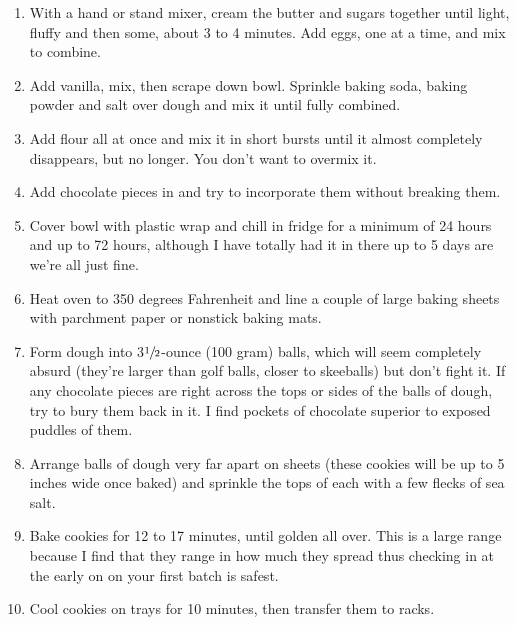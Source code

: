 \begin{enumerate}
    \item With a hand or stand mixer, cream the butter and sugars together until light, fluffy and then some, about 3 to 4 minutes. Add eggs, one at a time, and mix to combine.
    \item Add vanilla, mix, then scrape down bowl. Sprinkle baking soda, baking powder and salt over dough and mix it until fully combined. 
    \item Add flour all at once and mix it in short bursts until it almost completely disappears, but no longer. You don’t want to overmix it.
    \item Add chocolate pieces in and try to incorporate them without breaking them.
    \item Cover bowl with plastic wrap and chill in fridge for a minimum of 24 hours and up to 72 hours, although I have totally had it in there up to 5 days are we’re all just fine.
    \item Heat oven to 350 degrees Fahrenheit and line a couple of large baking sheets with parchment paper or nonstick baking mats.
    \item Form dough into 3$\sfrac{1}{2}$-ounce (100 gram) balls, which will seem completely absurd (they’re larger than golf balls, closer to skeeballs) but don’t fight it. If any chocolate pieces are right across the tops or sides of the balls of dough, try to bury them back in it. I find pockets of chocolate superior to exposed puddles of them. 
    \item Arrange balls of dough very far apart on sheets (these cookies will be up to 5 inches wide once baked) and sprinkle the tops of each with a few flecks of sea salt.
    \item Bake cookies for 12 to 17 minutes, until golden all over. This is a large range because I find that they range in how much they spread thus checking in at the early on on your first batch is safest.
    \item Cool cookies on trays for 10 minutes, then transfer them to racks.

\end{enumerate}
   

 




